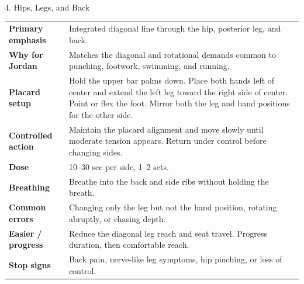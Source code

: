 \documentclass[10pt,letterpaper]{article}
\begin{document}
\begin{stretchbox}{4. Hips, Legs, and Back}
\begin{tabularx}{\textwidth}{@{}L{1.28in}Y@{}}
\textbf{Primary emphasis} & Integrated diagonal line through the hip, posterior leg, and back. \\
\textbf{Why for Jordan} & Matches the diagonal and rotational demands common to punching, footwork, swimming, and running. \\
\textbf{Placard setup} & Hold the upper bar palms down. Place both hands left of center and extend the left leg toward the right side of center. Point or flex the foot. Mirror both the leg and hand positions for the other side. \\
\textbf{Controlled action} & Maintain the placard alignment and move slowly until moderate tension appears. Return under control before changing sides. \\
\textbf{Dose} & 10--30 sec per side, 1--2 sets. \\
\textbf{Breathing} & Breathe into the back and side ribs without holding the breath. \\
\textbf{Common errors} & Changing only the leg but not the hand position, rotating abruptly, or chasing depth. \\
\textbf{Easier / progress} & Reduce the diagonal leg reach and seat travel. Progress duration, then comfortable reach. \\
\textbf{Stop signs} & Back pain, nerve-like leg symptoms, hip pinching, or loss of control. \\
\end{tabularx}
\end{stretchbox}
\end{document}
